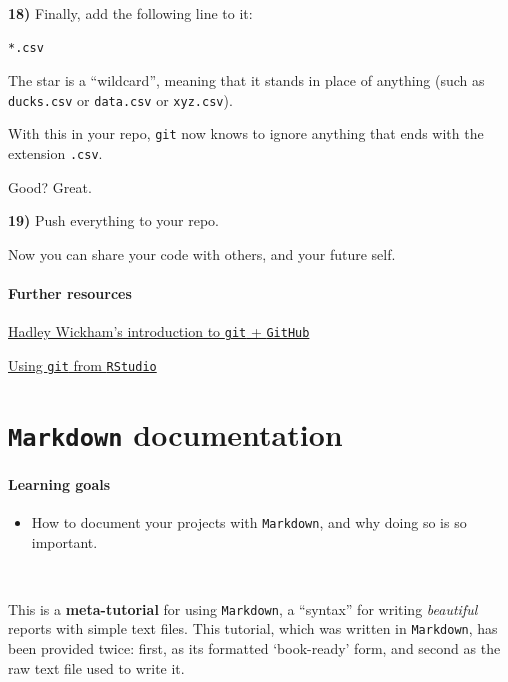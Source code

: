 \documentclass[]{book}
\providecommand{\tightlist}{%
  \setlength{\itemsep}{0pt}\setlength{\parskip}{0pt}}
\begin{document}
\textbf{18)} Finally, add the following line to it:

\begin{verbatim}
*.csv
\end{verbatim}

The star is a ``wildcard'', meaning that it stands in place of anything (such as \texttt{ducks.csv} or \texttt{data.csv} or \texttt{xyz.csv}).

With this in your repo, \texttt{git} now knows to ignore anything that ends with the extension \texttt{.csv}.

Good? Great.

\textbf{19)} Push everything to your repo.

Now you can share your code with others, and your future self.

\hypertarget{further-resources}{%
\subsubsection*{Further resources}\label{further-resources}}

\href{https://r-pkgs.org/git.html}{Hadley Wickham's introduction to \texttt{git} + \texttt{GitHub}}

\href{https://nceas.github.io/oss-lessons/version-control/4-getting-started-with-git-in-RStudio.html}{Using \texttt{git} from \texttt{RStudio}}

\hypertarget{markdown-documentation}{%
\chapter{\texorpdfstring{\texttt{Markdown} documentation}{Markdown documentation}}\label{markdown-documentation}}

\hypertarget{learning-goals-14}{%
\subsubsection*{Learning goals}\label{learning-goals-14}}

\begin{itemize}
\tightlist
\item
  How to document your projects with \texttt{Markdown}, and why doing so is so important.
\end{itemize}

~

This is a \textbf{meta-tutorial} for using \texttt{Markdown}, a ``syntax'' for writing
\emph{beautiful} reports with simple text files. This tutorial, which was written
in \texttt{Markdown}, has been provided twice: first, as its formatted `book-ready'
form, and second as the raw text file used to write it.
\end{document}
